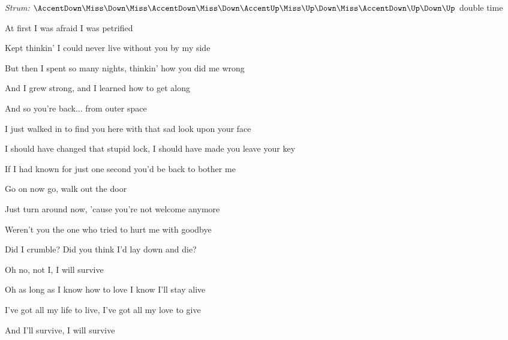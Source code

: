 \begin{song}


\begin{headerbox}
\textit{Strum:} $\AccentDown\Miss\Down\Miss\AccentDown\Miss\Down\AccentUp \Miss\Up\Down\Miss\AccentDown\Up\Down\Up$ double time
\end{headerbox}

\begin{hchordbox}
\end{hchordbox}

\bigskip

 \par
\smallskip
At first I was afraid I was petrified \par
Kept thinkin' I could never live without you by my side \par
But then I spent so many nights, thinkin' how you did me wrong \par
And I grew strong, and I learned how to get along \par

\bigskip

And so you're back... from outer space \par
I just walked in to find you here with that sad look upon your face \par
I should have changed that stupid lock, I should have made you leave your key \par
If I had known for just one second you'd be back to bother me \par

\bigskip

\begin{chorusbox}{\PrechorusAndChorus}
Go on now go, walk out the door \par
Just turn around now, 'cause you're not welcome anymore \par
{} Weren't you the one who tried to hurt me with goodbye \par
Did I crumble? Did you think I'd lay down and die? \par

\bigskip

Oh no, not I, I will survive \par
Oh as long as I know how to love I know I'll stay alive \par
I've got all my life to live, I've got all my love to give \par
And I'll survive, I will survive \par


\end{chorusbox}
\end{song}
